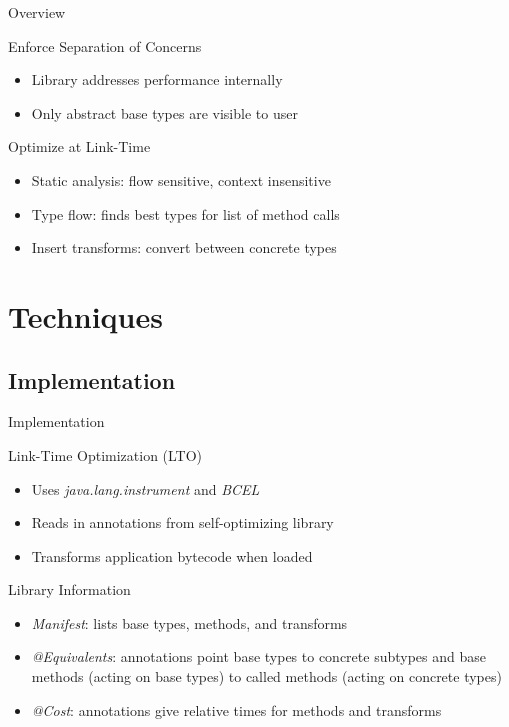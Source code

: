 \documentclass{beamer}
\begin{document}
\begin{frame}{Overview}
  \begin{block}{Enforce Separation of Concerns}
    \begin{itemize}
    \item Library addresses performance internally
    \item Only abstract base types are visible to user
    \end{itemize}
  \end{block}
\pause
  \begin{block}{Optimize at Link-Time}
    \begin{itemize}
    \item Static analysis: flow sensitive, context insensitive
    \item Type flow: finds best types for list of method calls
    \item Insert transforms: convert between concrete types
    \end{itemize}
  \end{block}
\end{frame}

\section{Techniques}

\subsection{Implementation}

\begin{frame}{Implementation}
  \begin{block}{Link-Time Optimization (LTO)}
    \begin{itemize}
    \item Uses {\it java.lang.instrument} and {\it BCEL}
    \item Reads in annotations from self-optimizing library
    \item Transforms application bytecode when loaded
    \end{itemize}
  \end{block}
\pause
  \begin{block}{Library Information}
    \begin{itemize}
    \item {\it Manifest}: lists base types, methods, and transforms
    \item {\it @Equivalents}: annotations point base types to concrete subtypes and base methods (acting on base types) to called methods (acting on concrete types)
    \item {\it @Cost}: annotations give relative times for methods and transforms
    \end{itemize}
  \end{block}
\end{frame}
\end{document}
